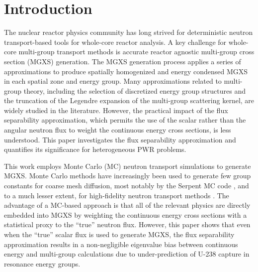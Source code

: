 \section{Introduction}
\label{sec:intro}

The nuclear reactor physics community has long strived for deterministic neutron transport-based tools for whole-core reactor analysis. A key challenge for whole-core multi-group transport methods is accurate reactor agnostic multi-group cross section (MGXS) generation. The MGXS generation process applies a series of approximations to produce spatially homogenized and energy condensed MGXS in each spatial zone and energy group. Many approximations related to multi-group theory, including the selection of discretized energy group structures and the truncation of the Legendre expansion of the multi-group scattering kernel, are widely studied in the literature. However, the practical impact of the flux separability approximation, which permits the use of the scalar rather than the angular neutron flux to weight the continuous energy cross sections, is less understood. This paper investigates the flux separability approximation and quantifies its significance for heterogeneous PWR problems.

This work employs Monte Carlo (MC) neutron transport simulations to generate MGXS. Monte Carlo methods have increasingly been used to generate few group constants for coarse mesh diffusion, most notably by the Serpent MC code \citep{serpent2013manual}, and to a much lesser extent, for high-fidelity neutron transport methods \citep{redmond1997multigroup, nelson2014improved, cai2014condensation, boyd2016thesis}. The advantage of a MC-based approach is that all of the relevant physics are directly embedded into MGXS by weighting the continuous energy cross sections with a statistical proxy to the ``true'' neutron flux. However, this paper shows that even when the ``true'' scalar flux is used to generate MGXS, the flux separability approximation results in a non-negligible eigenvalue bias between continuous energy and multi-group calculations due to under-prediction of U-238 capture in resonance energy groups.


